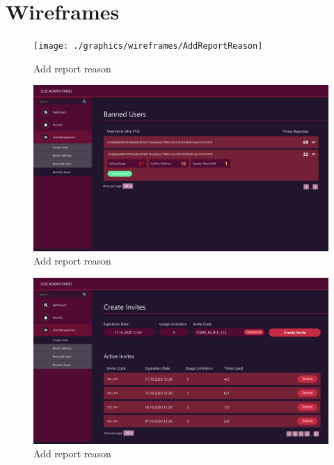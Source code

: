 
\chapter{Wireframes}\label{ch:wireframes}

\begin{figure}[h]
    \centering
    \texttt{[image: ./graphics/wireframes/AddReportReason]}
    \caption{Add report reason}
    \label{fig:figure6}
\end{figure}

\begin{figure}[h]
    \centering
    \includegraphics[width=1.0\textwidth]{./graphics/wireframes/AdminBlockedUsers}
    \caption{Add report reason}
    \label{fig:figure7}
\end{figure}

\begin{figure}[h]
    \centering
    \includegraphics[width=1.0\textwidth]{./graphics/wireframes/AdminCreateInvites}
    \caption{Add report reason}
    \label{fig:figure8}
\end{figure}

